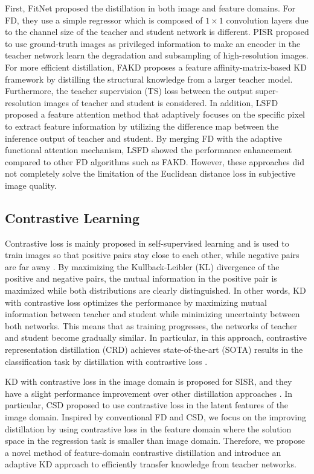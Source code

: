 \documentclass[10pt,twocolumn,letterpaper]{article}
\begin{document}
First, FitNet \cite{fitnet} proposed the distillation in both image and feature domains. For FD, they use a simple regressor which is composed of \begin{math}1\times1\end{math} convolution layers due to the channel size of the teacher and student network is different. PISR \cite{lee} proposed to use ground-truth images as privileged information to make an encoder in the teacher network learn the degradation and subsampling of high-resolution images. For more efficient distillation, FAKD proposes a feature affinity-matrix-based KD framework by distilling the structural knowledge from a larger teacher model. Furthermore, the teacher supervision (TS) loss between the output super-resolution images of teacher and student is considered. In addition, LSFD proposed a feature attention method that adaptively focuses on the specific pixel to extract feature information by utilizing the difference map between the inference output of teacher and student. By merging FD with the adaptive functional attention mechanism, LSFD showed the performance enhancement compared to other FD algorithms such as FAKD. However, these approaches did not completely solve the limitation of the Euclidean distance loss in subjective image quality.


\subsection{Contrastive Learning}
Contrastive loss is mainly proposed in self-supervised learning \cite{contrastive, adv} and is used to train images so that positive pairs stay close to each other, while negative pairs are far away \cite{crd, csd2021}. By maximizing the Kullback-Leibler (KL) divergence of the positive and negative pairs, the mutual information in the positive pair is maximized while both distributions are clearly distinguished. In other words, KD with contrastive loss optimizes the performance by maximizing mutual information between teacher and student while minimizing uncertainty between both networks. This means that as training progresses, the networks of teacher and student become gradually similar. In particular, in this approach, contrastive representation distillation (CRD) achieves state-of-the-art (SOTA) results in the classification task by distillation with contrastive loss \cite{crd}. 

KD with contrastive loss \cite{srcrd, csd2021} in the image domain is proposed for SISR, and they have a slight performance improvement over other distillation approaches \cite{fakd, lsfd}. In particular, CSD \cite{csd2021} proposed to use contrastive loss in the latent features of the image domain. Inspired by conventional FD and CSD, we focus on the improving distillation by using contrastive loss in the feature domain where the solution space in the regression task is smaller than image domain. Therefore, we propose a novel method of feature-domain contrastive distillation and introduce an adaptive KD approach to efficiently transfer knowledge from teacher networks. 
\end{document}
